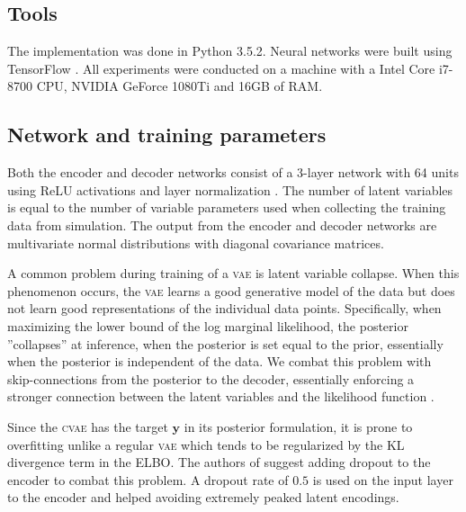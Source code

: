 \documentclass{kththesis}
\newcommand{\vy}{\boldsymbol{y}}
\newcommand{\vae}{\textsc{vae}}
\newcommand{\cvae}{\textsc{cvae}}
\newcommand{\dettostoc}{\textsc{det2stoc}}
\begin{document}


\subsection{Tools}

The implementation was done in Python 3.5.2. Neural networks were built using TensorFlow \parencite{tensorflow2015-whitepaper}. 
All experiments were conducted on a machine with a Intel Core i7-8700 CPU, NVIDIA GeForce 1080Ti and 16GB of RAM.

\subsection{Network and training parameters}
Both the encoder and decoder networks consist of a 3-layer network with 64 units using ReLU activations and layer normalization \parencite{Ba2016}. The number of latent variables is equal to the number of variable parameters used when collecting the training data from simulation. The output from the encoder and decoder networks are multivariate normal distributions with diagonal covariance matrices.

A common problem during training of a \vae{} is latent variable collapse. When this phenomenon occurs, the \vae{} learns a good generative model of the data but does not learn good representations of the individual data points. Specifically, when maximizing the lower bound of the log marginal likelihood, the posterior ''collapses'' at inference, when the posterior is set equal to the prior, essentially when the posterior is independent of the data. We combat this problem with skip-connections from the posterior to the decoder, essentially enforcing a stronger connection between the latent variables and the likelihood function \parencite{Dieng2018}.

Since the \cvae{} has the target $\vy$ in its posterior formulation, it is prone to overfitting unlike a regular \vae{} which tends to be regularized by the KL divergence term in the ELBO. The authors of \parencite{Sohn2015} suggest adding dropout to the encoder to combat this problem. A dropout rate of $0.5$ is used on the input layer to the encoder and helped avoiding extremely peaked latent encodings.
\end{document}

